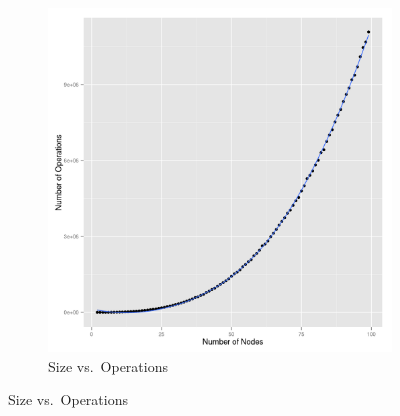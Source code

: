 \documentclass[10pt]{article}
\begin{document}
\begin{easylist}[enumerate]
\begin{figure}[ht]
\begin{subfigure}[b]{0.48\textwidth}
            \includegraphics[scale=0.35]{./img/sizevsoperations.png}
            \caption{Size vs.\ Operations}
        \end{subfigure}


\end{figure}
\end{easylist}
\end{document}
